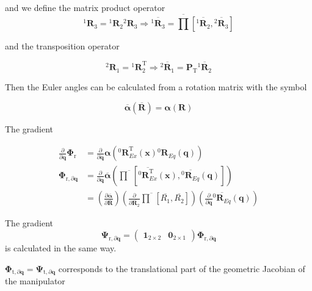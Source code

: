 \documentclass[twocolumn,10pt]{IFTOMM}
\newcommand{\bm}[1]{\boldsymbol{#1}}
\newcommand{\rotmat}[2]{{{ }^{#1}\boldsymbol{R}}_{#2}}
\newcommand{\transp}[0]{{\mathrm{T}}}
\begin{document}
and we define the matrix product operator
\begin{equation}
\rotmat{1}{3}
=
\rotmat{1}{2}
\rotmat{2}{3}
\Rightarrow
\overline{\rotmat{1}{3}}
=
\overline{\prod}\left[ \overline{\rotmat{1}{2}}, \overline{\rotmat{2}{3}}\right]
\label{equ:matprod}
\end{equation}

and the transposition operator

\begin{equation}
\rotmat{2}{1}
=
\rotmat{1}{2}^\transp
\Rightarrow
\overline{\rotmat{2}{1}}
=
\bm{P}_\transp \overline{\rotmat{1}{2}}
\end{equation}

Then the Euler angles can be calculated from a rotation matrix with the symbol

\begin{equation}
\overline{\bm{\alpha}}(\overline{\bm{R}})
=
\bm{\alpha}(\bm{R})
\end{equation}

The gradient


\begin{align}
\frac{\partial}{\partial \bm{q}}\bm{\Phi}_{\mathrm{r}}
&=
\frac{\partial}{\partial \bm{q}} \bm{\alpha}\left(\rotmat{0}{Ex}^\transp(\bm{x}) \rotmat{0}{Eq}(\bm{q})\right) \label{equ:grad_Phi_q}\\
\bm{\Phi}_{\mathrm{r},\partial\bm{q}}
&=
\frac{\partial}{\partial \bm{q}} \overline{\bm{\alpha}}\left(\overline{\prod}\left[ \overline{\rotmat{0}{Ex}^\transp}(\bm{x}), \overline{\rotmat{0}{Eq}}(\bm{q})\right]\right) \nonumber \\
&=
\left(\frac{\partial \overline{\bm{\alpha}}}{\partial \overline{\bm{R}}}\right)
\left(\frac{\partial }{\partial \overline{\bm{R}_2}}
\overline{\prod}\left[ \overline{R_1}, \overline{R_2}\right]\right)
\left(\frac{\partial}{\partial \bm{q}} \overline{\rotmat{0}{Eq}}(\bm{q})\right)  \nonumber
\end{align}

The gradient
\begin{equation}
\bm{\Psi}_{\mathrm{r},\partial\bm{q}}
=
\begin{pmatrix} \bm{1}_{2 \times 2} & \bm{0}_{2 \times 1}\end{pmatrix} \bm{\Phi}_{\mathrm{r},\partial\bm{q}}
\end{equation}
is calculated in the same way.

$\bm{\Phi}_{\mathrm{t},\partial\bm{q}}=\bm{\Psi}_{\mathrm{t},\partial\bm{q}}$ corresponds to the translational part of the geometric Jacobian of the manipulator
\end{document}
